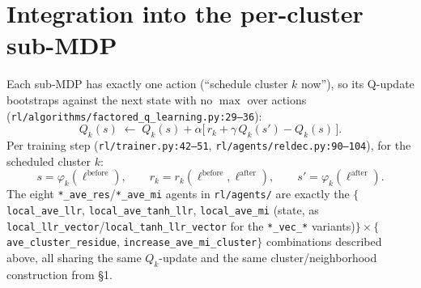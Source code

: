 \documentclass[11pt]{article}
\newcommand{\code}[1]{\texttt{#1}}
\newcommand{\file}[1]{\texttt{#1}}
\begin{document}
\section{Integration into the per-cluster sub-MDP}

Each sub-MDP has exactly one action (``schedule cluster $k$ now''), so its Q-update
bootstraps against the next state with no $\max$ over actions
(\file{rl/algorithms/factored\_q\_learning.py:29--36}):
\[
Q_k(s) \;\leftarrow\; Q_k(s) + \alpha\big[\,r_k + \gamma\, Q_k(s') - Q_k(s)\,\big].
\]
Per training step (\file{rl/trainer.py:42--51}, \file{rl/agents/reldec.py:90--104}),
for the scheduled cluster $k$:
\[
s = \varphi_k(\ell^{\mathrm{before}}), \qquad
r_k = r_k(\ell^{\mathrm{before}}, \ell^{\mathrm{after}}), \qquad
s' = \varphi_k(\ell^{\mathrm{after}}).
\]
The eight \code{*\_ave\_res}/\code{*\_ave\_mi} agents in \file{rl/agents/} are exactly
the $\{$\code{local\_ave\_llr}, \code{local\_ave\_tanh\_llr}, \code{local\_ave\_mi}
(state, as \code{local\_llr\_vector}/\code{local\_tanh\_llr\_vector} for the
\code{*\_vec\_*} variants)$\} \times \{$\code{ave\_cluster\_residue},
\code{increase\_ave\_mi\_cluster}$\}$ combinations described above, all sharing the
same $Q_k$-update and the same cluster/neighborhood construction from \S1.
\end{document}
